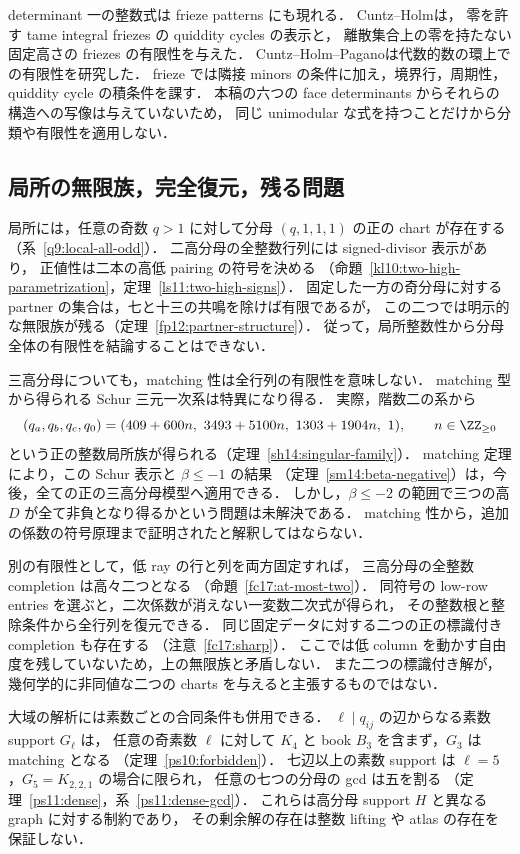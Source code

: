 determinant 一の整数式は frieze patterns にも現れる．
Cuntz--Holm\cite[\S\S2--3 and~7]{CuntzHolmFriezes}は，
零を許す tame integral friezes の quiddity cycles の表示と，
離散集合上の零を持たない固定高さの friezes の有限性を与えた．
Cuntz--Holm--Pagano\cite{CuntzHolmPagano}は代数的数の環上での有限性を研究した．
frieze では隣接 minors の条件に加え，境界行，周期性，quiddity cycle の積条件を課す．
本稿の六つの face determinants からそれらの構造への写像は与えていないため，
同じ unimodular な式を持つことだけから分類や有限性を適用しない．

\subsection{局所の無限族，完全復元，残る問題}

局所には，任意の奇数 $q>1$ に対して分母 $(q,1,1,1)$ の正の chart が存在する
（系~\ref{q9:local-all-odd}）．
二高分母の全整数行列には signed-divisor 表示があり，
正値性は二本の高低 pairing の符号を決める
（命題~\ref{kl10:two-high-parametrization}，定理~\ref{ls11:two-high-signs}）．
固定した一方の奇分母に対する partner の集合は，七と十三の共鳴を除けば有限であるが，
この二つでは明示的な無限族が残る（定理~\ref{fp12:partner-structure}）．
従って，局所整数性から分母全体の有限性を結論することはできない．

三高分母についても，matching 性は全行列の有限性を意味しない．
matching 型から得られる Schur 三元一次系は特異になり得る．
実際，階数二の系から
\[
 (q_a,q_b,q_c,q_0)
 =(409+600n,\ 3493+5100n,\ 1303+1904n,\ 1),
 \qquad n\in\ZZ_{\ge0}
\]
という正の整数局所族が得られる（定理~\ref{sh14:singular-family}）．
matching 定理により，この Schur 表示と $\beta\le-1$ の結果
（定理~\ref{sm14:beta-negative}）は，今後，全ての正の三高分母模型へ適用できる．
しかし，$\beta\le-2$ の範囲で三つの高 $D$ が全て非負となり得るかという問題は未解決である．
matching 性から，追加の係数の符号原理まで証明されたと解釈してはならない．

別の有限性として，低 ray の行と列を両方固定すれば，
三高分母の全整数 completion は高々二つとなる
（命題~\ref{fc17:at-most-two}）．
同符号の low-row entries を選ぶと，二次係数が消えない一変数二次式が得られ，
その整数根と整除条件から全行列を復元できる．
同じ固定データに対する二つの正の標識付き completion も存在する
（注意~\ref{fc17:sharp}）．
ここでは低 column を動かす自由度を残していないため，上の無限族と矛盾しない．
また二つの標識付き解が，幾何学的に非同値な二つの charts を与えると主張するものではない．

大域の解析には素数ごとの合同条件も併用できる．
$\ell\mid q_{ij}$ の辺からなる素数 support $G_\ell$ は，
任意の奇素数 $\ell$ に対して $K_4$ と book $B_3$ を含まず，$G_3$ は matching となる
（定理~\ref{ps10:forbidden}）．
七辺以上の素数 support は $\ell=5$，$G_5=K_{2,2,1}$ の場合に限られ，
任意の七つの分母の gcd は五を割る
（定理~\ref{ps11:dense}，系~\ref{ps11:dense-gcd}）．
これらは高分母 support $H$ と異なる graph に対する制約であり，
その剰余解の存在は整数 lifting や atlas の存在を保証しない．

